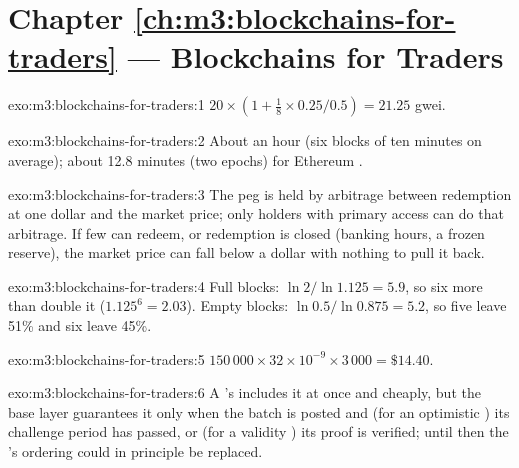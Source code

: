 \section*{Chapter \ref{ch:m3:blockchains-for-traders} --- Blockchains for Traders}

\begin{solution}{exo:m3:blockchains-for-traders:1}
$20 \times (1 + \tfrac18 \times 0.25/0.5) = 21.25$ gwei.
\end{solution}

\begin{solution}{exo:m3:blockchains-for-traders:2}
About an hour (six blocks of ten minutes on average); about 12.8 minutes (two epochs) for Ethereum .
\end{solution}

\begin{solution}{exo:m3:blockchains-for-traders:3}
The peg is held by arbitrage between redemption at one dollar and the market price; only holders with primary
access can do that arbitrage. If few can redeem, or redemption is closed (banking hours, a frozen reserve), the
market price can fall below a dollar with nothing to pull it back.
\end{solution}

\begin{solution}{exo:m3:blockchains-for-traders:4}
Full blocks: $\ln 2/\ln 1.125 = 5.9$, so six more than double it ($1.125^6 = 2.03$). Empty blocks:
$\ln 0.5/\ln 0.875 = 5.2$, so five leave 51\% and six leave 45\%.
\end{solution}

\begin{solution}{exo:m3:blockchains-for-traders:5}
$150\,000 \times 32 \times 10^{-9} \times 3\,000 = \$14.40$.
\end{solution}

\begin{solution}{exo:m3:blockchains-for-traders:6}
A 's  includes it at once and cheaply, but the base layer guarantees it only when the batch is
posted and (for an optimistic ) its challenge period has passed, or (for a validity ) its proof is
verified; until then the 's ordering could in principle be replaced.
\end{solution}


